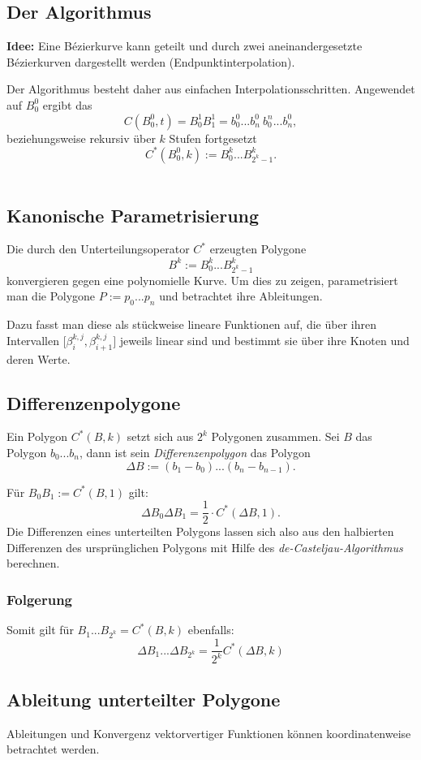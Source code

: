 \subsection{Der Algorithmus}
\textbf{Idee:} Eine Bézierkurve kann geteilt und durch zwei aneinandergesetzte Bézierkurven dargestellt werden (Endpunktinterpolation).

Der Algorithmus besteht daher aus einfachen Interpolationsschritten. Angewendet auf \(B_0^0\) ergibt das
\[C(B_0^0,t) = B_0^1B_1^1 = b_0^0...b_n^0~b_0^n...b_n^0,\]
beziehungsweise rekursiv über \(k\) Stufen fortgesetzt
\[C^*(B_0^0,k):=B_0^k...B_{2^k-1}^k.\]
\text{}\\



\subsection{Kanonische Parametrisierung}
Die durch den Unterteilungsoperator \(C^*\) erzeugten Polygone
\[B^k := B_0^k...B_{2^k-1}^k\]
konvergieren gegen eine polynomielle Kurve. Um dies zu zeigen, parametrisiert man die Polygone \(P:=p_0...p_n\) und betrachtet ihre Ableitungen.

Dazu fasst man diese als stückweise lineare Funktionen auf, die über ihren Intervallen \(\lbrack \beta_i^{k,j},\beta_{i+1}^{k,j}\rbrack\) jeweils linear sind und bestimmt sie über ihre Knoten und deren Werte.


\subsection{Differenzenpolygone}
Ein Polygon \(C^*(B,k)\) setzt sich aus \(2^k\) Polygonen zusammen. Sei \(B\) das Polygon \(b_0...b_n\), dann ist sein \textit{Differenzenpolygon} das Polygon
\[\Delta B := (b_1-b_0)...(b_n-b_{n-1}).\]

Für \(B_0B_1 := C^*(B,1)\) gilt:
\[\Delta B_0\Delta B_1 = \frac{1}{2}\cdot C^*(\Delta B,1).\]
Die Differenzen eines unterteilten Polygons lassen sich also aus den halbierten Differenzen des ursprünglichen Polygons mit Hilfe des \textit{de-Casteljau-Algorithmus} berechnen.

\subsubsection{Folgerung}
Somit gilt für \(B_1...B_{2^k} = C^*(B,k)\) ebenfalls:
\[\Delta B_1...\Delta B_{2^k} = \frac{1}{2^k}C^*(\Delta B,k)\]


\subsection{Ableitung unterteilter Polygone}
Ableitungen und Konvergenz vektorvertiger Funktionen können koordinatenweise betrachtet werden.

